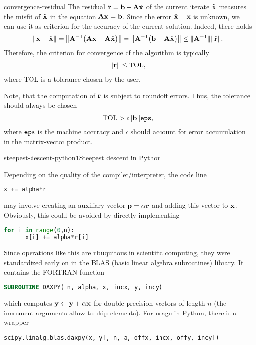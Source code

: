\begin{Remark}{convergence-residual}
  The residual $\tilde \vr = \vb - \mata\tilde\vx$ of the current iterate
  $\tilde\vx$ measures the misfit of $\tilde\vx$ in the equation
  $\mata\vx = \vb$. Since the error $\tilde\vx-\vx$ is unknown, we can
  use it as criterion for the accuracy of the current
  solution. Indeed, there holds
  \begin{gather}
    \norm{\vx-\tilde\vx}
    = \norm*{\mata^{-1}\bigl(\mata\vx - \mata\tilde\vx\bigr)}
    = \norm*{\mata^{-1}\bigl(\vb - \mata\tilde\vx\bigr)}
    \le \norm{\mata^{-1}}\norm{\tilde \vr}.
  \end{gather}
  Therefore, the criterion for convergence of the algorithm is typically
  \begin{gather}
    \norm{\tilde \vr} \le \text{TOL},
  \end{gather}
  where TOL is a tolerance chosen by the user.

  Note, that the computation of $\tilde \vr$ is subject to roundoff
  errors. Thus, the tolerance should always be chosen
  \begin{gather}
    \text{TOL} > c\norm{\vb}\eps,
  \end{gather}
  where $\eps$ is the machine accuracy and $c$ should account for
  error accumulation in the matrix-vector product.
\end{Remark}

\begin{Algorithm*}{steepest-descent-python1}{Steepest descent in Python}
  
\end{Algorithm*}

\begin{remark}
  Depending on the quality of the compiler/interpreter, the code line
  \begin{lstlisting}[language=Python,numbers=none]
    x += alpha*r
  \end{lstlisting}
  may involve creating an auxiliary vector $\vp = \alpha \vr$ and
  adding this vector to $\vx$.  Obviously, this could be avoided by
  directly implementing
  \begin{lstlisting}[language=Python,numbers=none]
    for i in range(0,n):
      x[i] += alpha*r[i]
  \end{lstlisting}
  Since operations like this are ubuquitous in scientific computing,
  they were standardized early on in the BLAS (basic linear algebra
  subroutines) library. It contains the FORTRAN function
  \begin{lstlisting}[language=Fortran,numbers=none]
    SUBROUTINE DAXPY( n, alpha, x, incx, y, incy)
  \end{lstlisting}
  which computes $\vy\gets\vy+\alpha\vx$ for double precision vectors
  of length $n$ (the increment arguments allow to skip elements). For
  usage in Python, there is a wrapper
  \begin{lstlisting}[language=Python,numbers=none]
    scipy.linalg.blas.daxpy(x, y[, n, a, offx, incx, offy, incy])
  \end{lstlisting}
\end{remark}

